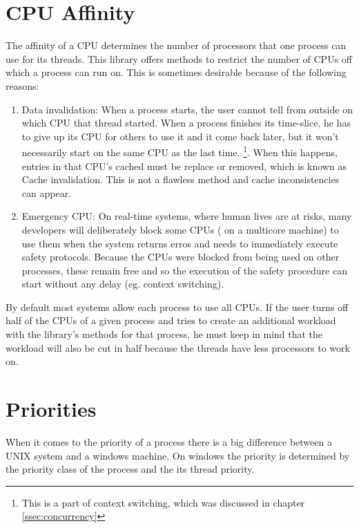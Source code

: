 \section{CPU Affinity}
The affinity of a CPU determines the number of processors that one process can use for its threads.
This library offers methods to restrict the number of CPUs off which a process can run on. This is
sometimes desirable because of the following reasons:
\begin{enumerate}
	\item Data invalidation: When a process starts, the user cannot tell from outside on which CPU
	that thread started. When a process finishes its time-slice, he has to give up its CPU for
	others to use it and it come back later, but it won't necessarily start on the same CPU as the
	last time. \footnote{This is a part of context switching, which was discussed in chapter \ref{ssec:concurrency}}. When this happens, entries in that CPU's cached must be replace or removed,
	which is known as \dq Cache invalidation\dq{}. This is not a flawless method and cache inconsistencies
	can appear.
	\item Emergency CPU: On real-time systems, where human lives are at risks, many developers will
	deliberately block some CPUs ( on a multicore machine) to use them when the system returns
	erros and needs to immediately execute safety protocols. Because the CPUs were blocked
	from being used on other processes, these remain free and so the execution of the safety procedure can start without any delay (eg. context switching).
	
\end{enumerate}

By default most systems allow each process to use all CPUs. If the user turns off half of the
CPUs of a given process and tries to create an additional workload with the library's methods for that process, he must keep in
mind that the workload will also be cut in half because the threads have less processors to work on.
\section{Priorities}
When it comes to the priority of a process there is a big difference between a UNIX system and a
windows machine. On windows the priority is determined by the priority class of the process and the
its thread priority.\\
